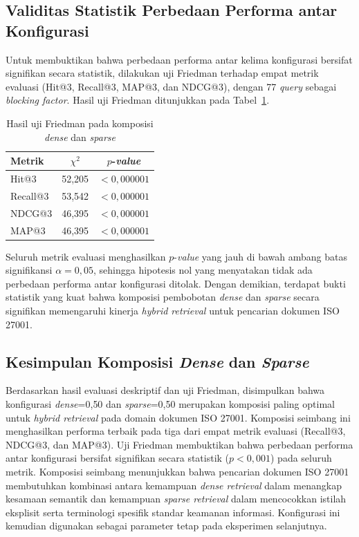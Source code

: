 \subsection{Validitas Statistik Perbedaan Performa antar Konfigurasi}

Untuk membuktikan bahwa perbedaan performa antar kelima konfigurasi bersifat signifikan secara statistik, dilakukan uji Friedman terhadap empat metrik evaluasi (Hit@3, Recall@3, MAP@3, dan NDCG@3), dengan 77 \textit{query} sebagai \textit{blocking factor}. Hasil uji Friedman ditunjukkan pada Tabel~\ref{tbl:412_friedman_hybrid}.

\begin{table}[H]
	\centering
	\caption{Hasil uji Friedman pada komposisi \textit{dense} dan \textit{sparse}}
	\label{tbl:412_friedman_hybrid}
	\small
	\begin{tabular}{lcc}
		\toprule
		Metrik & $\chi^2$ & $p$-\textit{value} \\
		\midrule
		Hit@3  & 52{,}205 & $< 0{,}000001$ \\
		Recall@3    & 53{,}542 & $< 0{,}000001$ \\
		NDCG@3      & 46{,}395 & $< 0{,}000001$ \\
		MAP@3       & 46{,}395 & $< 0{,}000001$ \\
	\end{tabular}
\end{table}

Seluruh metrik evaluasi menghasilkan $p$-\textit{value} yang jauh di bawah ambang batas signifikansi $\alpha = 0{,}05$, sehingga hipotesis nol yang menyatakan tidak ada perbedaan performa antar konfigurasi ditolak. Dengan demikian, terdapat bukti statistik yang kuat bahwa komposisi pembobotan \textit{dense} dan \textit{sparse} secara signifikan memengaruhi kinerja \textit{hybrid retrieval} untuk pencarian dokumen ISO 27001.

\subsection{Kesimpulan Komposisi \textit{Dense} dan \textit{Sparse}}

Berdasarkan hasil evaluasi deskriptif dan uji Friedman, disimpulkan bahwa konfigurasi \textit{dense}=0{,}50 dan \textit{sparse}=0{,}50 merupakan komposisi paling optimal untuk \textit{hybrid retrieval} pada domain dokumen ISO 27001. Komposisi seimbang ini menghasilkan performa terbaik pada tiga dari empat metrik evaluasi (Recall@3, NDCG@3, dan MAP@3). Uji Friedman membuktikan bahwa perbedaan performa antar konfigurasi bersifat signifikan secara statistik ($p < 0{,}001$) pada seluruh metrik. Komposisi seimbang menunjukkan bahwa pencarian dokumen ISO 27001 membutuhkan kombinasi antara kemampuan \textit{dense retrieval} dalam menangkap kesamaan semantik dan kemampuan \textit{sparse retrieval} dalam mencocokkan istilah eksplisit serta terminologi spesifik standar keamanan informasi. Konfigurasi ini kemudian digunakan sebagai parameter tetap pada eksperimen selanjutnya.


